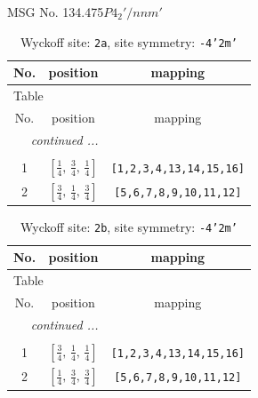 \documentclass[fleqn,8pt]{jsarticle}
\begin{document}
\setcounter{MaxMatrixCols}{32}

\renewcommand{\tablename}{Table~}
\renewcommand{\figurename}{Figure~}
\begin{center}
\LARGE
MSG No. 134.475\quad$P4_{2}'/nnm'$
\end{center}
\renewcommand{\arraystretch}{1.2}
\begin{longtable}{ccc}
\caption{Wyckoff site: {\tt 2a}, site symmetry: {\tt -4'2m'}}
 \\
 \hline \hline
No. & position & mapping \\ \hline \endfirsthead

\multicolumn{2}{l}{\tablename\ \thetable{}} \\
 \hline \hline
No. & position & mapping \\ \hline \endhead

 \hline \hline
\multicolumn{2}{r}{\footnotesize\it continued ...} \\ \endfoot

 \hline \hline
\multicolumn{2}{r}{} \\ \endlastfoot

1 & $\left[ \frac{1}{4},\, \frac{3}{4},\, \frac{1}{4} \right]$ & {\tt [1,2,3,4,13,14,15,16]} \\ \hline
2 & $\left[ \frac{3}{4},\, \frac{1}{4},\, \frac{3}{4} \right]$ & {\tt [5,6,7,8,9,10,11,12]} \\
\end{longtable}
\renewcommand{\arraystretch}{1.2}
\begin{longtable}{ccc}
\caption{Wyckoff site: {\tt 2b}, site symmetry: {\tt -4'2m'}}
 \\
 \hline \hline
No. & position & mapping \\ \hline \endfirsthead

\multicolumn{2}{l}{\tablename\ \thetable{}} \\
 \hline \hline
No. & position & mapping \\ \hline \endhead

 \hline \hline
\multicolumn{2}{r}{\footnotesize\it continued ...} \\ \endfoot

 \hline \hline
\multicolumn{2}{r}{} \\ \endlastfoot

1 & $\left[ \frac{3}{4},\, \frac{1}{4},\, \frac{1}{4} \right]$ & {\tt [1,2,3,4,13,14,15,16]} \\ \hline
2 & $\left[ \frac{1}{4},\, \frac{3}{4},\, \frac{3}{4} \right]$ & {\tt [5,6,7,8,9,10,11,12]} \\
\end{longtable}
\end{document}
